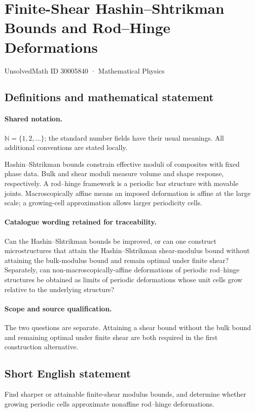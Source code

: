 \documentclass[11pt]{article}
\begin{document}
\setcounter{section}{30005839}
\section{Finite-Shear Hashin–Shtrikman Bounds and Rod–Hinge Deformations}\label{30005840}
{\small UnsolvedMath ID 30005840 · Mathematical Physics}
\subsection{Definitions and mathematical statement}

\paragraph{Shared notation.}$\mathbb N=\{1,2,\ldots\}$; the standard number fields have their usual meanings. All additional conventions are stated locally.


Hashin--Shtrikman bounds constrain effective moduli of composites with fixed phase data. Bulk and shear moduli measure volume and shape response, respectively. A rod--hinge framework is a periodic bar structure with movable joints. Macroscopically affine means an imposed deformation is affine at the large scale; a growing-cell approximation allows larger periodicity cells.

\paragraph{Catalogue wording retained for traceability.}
Can the Hashin–Shtrikman bounds be improved, or can one construct microstructures that attain the Hashin–Shtrikman shear-modulus bound without attaining the bulk-modulus bound and remain optimal under finite shear? Separately, can non-macroscopically-affine deformations of periodic rod–hinge structures be obtained as limits of periodic deformations whose unit cells grow relative to the underlying structure?

\paragraph{Scope and source qualification.}The two questions are separate. Attaining a shear bound without the bulk bound and remaining optimal under finite shear are both required in the first construction alternative.
\subsection{Short English statement}
Find sharper or attainable finite-shear modulus bounds, and determine whether growing periodic cells approximate nonaffine rod--hinge deformations.
\end{document}
